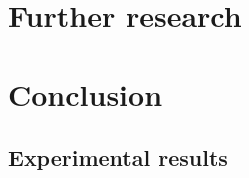 \documentclass[a4paper,12pt,titlepage,twoside,openany]{book}
\begin{document}
\chapter{Further research}
\label{ch:further}


\chapter{Conclusion}
\label{ch:conclusion}


\begingroup
    \setlength{\bibsep}{4pt}
    \singlespacing
    
\endgroup

\begin{appendices}


    \chapter{Experimental results}
    \label{ch:results_tables}
    

\end{appendices}

\resetpath

\cleardoublepage


\cleardoublepage
\begin{titlepage}

\end{titlepage}

\cleardoublepage
\begin{titlepage}

\end{titlepage}
\end{document}
